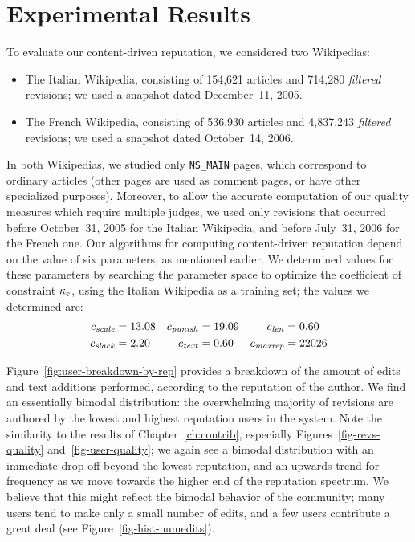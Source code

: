\section{Experimental Results}

To evaluate our content-driven reputation, we considered two Wikipedias:
%
\begin{itemize}

\item The Italian Wikipedia, consisting of 154,621 articles and 714,280
  {\em filtered\/} revisions; we used a snapshot dated December~11, 2005.
\item The French Wikipedia, consisting of 536,930 articles and
  4,837,243 {\em filtered\/} revisions; we used a snapshot dated
  October~14, 2006.

\end{itemize}
%
In both Wikipedias, we studied only \texttt{NS\_MAIN} pages, which
correspond to ordinary articles (other pages are used as comment
pages, or have other specialized purposes).
Moreover, to allow the accurate computation of our quality
measures which require multiple judges,
we used only revisions that occurred before October~31, 2005 for
the Italian Wikipedia, and before July~31, 2006 for the French one.
Our algorithms for computing content-driven reputation depend on the
value of six parameters, as mentioned earlier.
We determined values for these parameters by searching the parameter
space to optimize the coefficient of constraint $\kappa_e$, using the Italian
Wikipedia as a training set; the values we determined are:
%
\begin{align*}
   {c_{{\text{\textit{scale}}}}}      & = 13.08
  & {c_{{\text{\textit{punish}}}}}   & = 19.09
  & {c_{{\text{\textit{len}}}}}     & = 0.60   \\
   {c_{{\text{\textit{slack}}}}}         & = 2.20
  & {c_{{\text{\textit{text}}}}}     & = 0.60
  & {c_{{\text{\textit{maxrep}}}}}   & = 22026
\end{align*}

Figure~\ref{fig:user-breakdown-by-rep} provides a breakdown of
the amount of edits and text additions performed, according to the
reputation of the author.
We find an essentially bimodal distribution:
the overwhelming majority of revisions are authored by the
lowest and highest reputation users in the system.
Note the similarity to the results of Chapter~\ref{ch:contrib},
especially Figures~\ref{fig-revs-quality} and~\ref{fig-user-quality};
we again see a bimodal distribution with an immediate drop-off beyond
the lowest reputation, and an upwards trend for frequency as we move
towards the higher end of the reputation spectrum.
We believe that this might reflect the bimodal behavior of the
community; many users tend to make only a small number of edits, and a few users
contribute a great deal (see Figure~\ref{fig-hist-numedits}).


